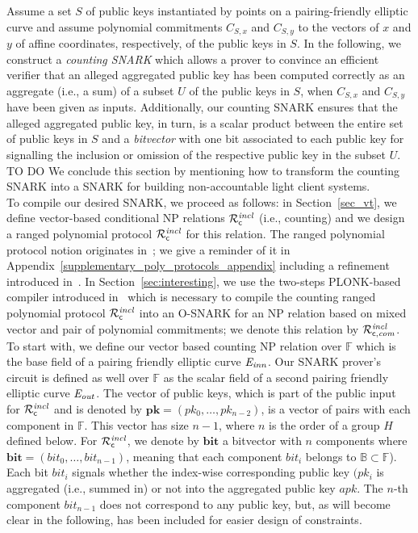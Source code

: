 Assume a set $S$ of public keys instantiated by points on a pairing-friendly elliptic curve and assume polynomial commitments $C_{S,x}$ and $C_{S,y}$ 
to the vectors of $x$ and $y$ of affine coordinates, respectively, of the public keys in $S$. In the following, we construct 
a \emph{counting SNARK} which allows a prover to convince an efficient verifier that an alleged 
aggregated public key has been computed correctly as an aggregate (i.e., a sum) of a subset $U$ of the public keys in $S$, 
when $C_{S,x}$ and $C_{S,y}$ have been given as inputs. Additionally, our counting SNARK ensures that the alleged 
aggregated public key, in turn, is a scalar product between the entire set of public keys in $S$ and a \emph{bitvector} with one bit associated to each public key 
for signalling the inclusion or omission of the respective public key in the subset $U$.  
{\color{blue} TO DO We conclude this section by mentioning how to transform the counting SNARK into a SNARK for building non-accountable light client systems.} \\

\noindent To compile our desired SNARK, we proceed as follows: in Section~\ref{sec_vt}, we define vector-based 
conditional NP relations $\mathcal{R}^{\mathit{incl}}_{\mathsf{c}}$ (i.e., counting) and we design a ranged polynomial protocol $\mathcal{R}^{\mathit{incl}}_{\mathsf{c}}$ for this relation. 
The ranged polynomial protocol notion originates in~\cite{plonk}; we give a reminder of it in 
Appendix~\ref{supplementary_poly_protocols_appendix} including a refinement introduced in~\cite{LC_paper}. In 
Section~\ref{sec:interesting}, we use the two-steps PLONK-based compiler introduced in~\cite{LC_paper} which is 
necessary to compile the counting ranged polynomial protocol $\mathcal{R}^{\mathit{incl}}_{\mathsf{c}}$ into an O-SNARK for an NP relation based on mixed 
vector and pair of polynomial commitments; we denote this relation by $\mathcal{R}^{\mathit{incl}}_{\mathsf{c},\mathit{com}}$. \\

\noindent To start with, we define our vector based counting NP relation over $\mathbb{F}$ which is the base field of a pairing friendly 
elliptic curve $\mathit{E}_{\mathit{inn}}$. Our SNARK prover's circuit is defined as well over $\mathbb{F}$ as the scalar field of a second pairing friendly elliptic 
curve $\mathit{E}_{\mathit{out}}$. The vector of public keys, which is part of the public input for $\mathcal{R}^{\mathit{incl}}_{\mathsf{c}}$ and is denoted by 
$\mathbf{pk} = (\mathit{pk_0}, \ldots, \mathit{pk_{n-2}})$, is a vector of pairs with each component in $\mathbb{F}$. 
This vector has size $n-1$, where $n$ is the order of a group $H$ defined below. For $\mathcal{R}^{\mathit{incl}}_{\mathsf{c}}$, we denote by $\mathbf{bit}$ a bitvector with 
$n$ components where $\mathbf{bit} = (\mathit{bit_0}, \ldots, \mathit{bit_{n-1}})$, meaning that each component $\mathit{bit_i}$ belongs 
to $\mathbb{B} \subset \mathbb{F}$). Each bit $\mathit{bit_i}$ signals  whether the index-wise corresponding public key $(\mathit{pk_i}$ 
is aggregated (i.e., summed in) or not into the aggregated public key $\mathit{apk}$. The $n$-th component $\mathit{bit_{n-1}}$ does 
not correspond to any public key, but, as will become clear in the following, has been included for easier design of constraints. \\ 

